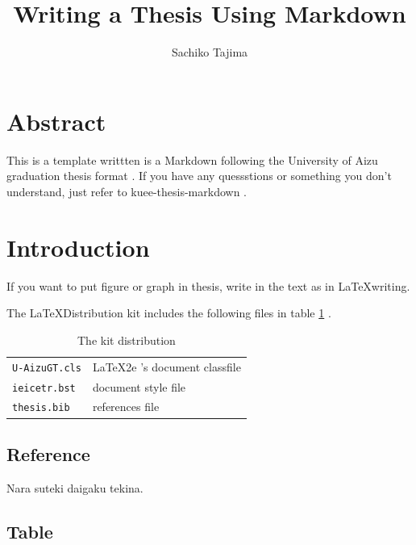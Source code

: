 \documentclass[
  ams,
  uplatex]{U-AizuGT}
\title{Writing a Thesis Using Markdown}
\author{Sachiko Tajima}
\begin{document}
    \maketitle

    \hypertarget{abstract}{%
    \section{Abstract}\label{abstract}}

    This is a template writtten is a Markdown following the University of
    Aizu graduation thesis format \cite{graduation-thesis}. If you have any
    quessstions or something you don't understand, just refer to
    kuee-thesis-markdown \cite{kuee-thesis-markdown} .

    \hypertarget{introduction}{%
    \section{Introduction}\label{introduction}}

    If you want to put figure or graph in thesis, write in the text as in
    \LaTeX writing.

    The \LaTeX Distribution kit includes the following files in table
    \ref{tab:kit} .

    \begin{table}[htbp]
      \caption{The kit distribution}\label{tab:kit}
      \begin{center}
        \begin{tabular}{ll}
          \verb+U-AizuGT.cls+ &  \LaTeX2e{} 's document classfile       \\
          \verb+ieicetr.bst+ & document style file \cite{ieicetr} \\
          \verb+thesis.bib+ & references file              \\
        \end{tabular}
      \end{center}
    \end{table}

    \hypertarget{reference}{%
    \subsection{Reference}\label{reference}}

    Nara suteki daigaku \cite{nara-nice} tekina.

    \hypertarget{table}{%
    \subsection{Table}\label{table}}
\end{document}
